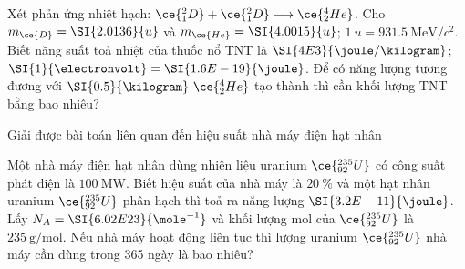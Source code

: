 \begin{vd}
	Xét phản ứng nhiệt hạch: $\ce{^2_1D}+\ce{^2_1D}\longrightarrow \ce{^4_2 He}$. Cho $m_{\ce{D}}=\SI{2.0136}{u}$ và $m_{\ce{He}}=\SI{4.0015}{u}$; $\SI{1}{u}=\SI{931.5}{\mega\electronvolt/c^2}$. Biết năng suất toả nhiệt của thuốc nổ TNT là $\SI{4E3}{\joule/\kilogram}$; $\SI{1}{\electronvolt}=\SI{1.6E-19}{\joule}$. Để có năng lượng tương đương với $\SI{0.5}{\kilogram}\ \ce{^4_2He}$ tạo thành thì cần khối lượng TNT bằng bao nhiêu?
\end{vd}
\begin{dang}{Giải được bài toán liên quan đến hiệu suất nhà máy điện hạt nhân}
	\end{dang}
\begin{vd}
Một nhà máy điện hạt nhân dùng nhiên liệu uranium $\ce{^{235}_{92}U}$ có công suất phát điện là $\SI{100}{\mega\watt}$. Biết hiệu suất của nhà máy là $\SI{20}{\percent}$ và một hạt nhân uranium $\ce{^{235}_{92}U}$ phân hạch thì toả ra năng lượng $\SI{3.2E-11}{\joule}$. Lấy $N_A=\SI{6.02E23}{\mole^{-1}}$ và khối lượng mol của $\ce{^{235}_{92}U}$ là $\SI{235}{\gram/\mole}$. Nếu nhà máy hoạt động liên tục thì lượng uranium $\ce{^{235}_{92}U}$ nhà máy cần dùng trong 365 ngày là bao nhiêu?
\end{vd}
